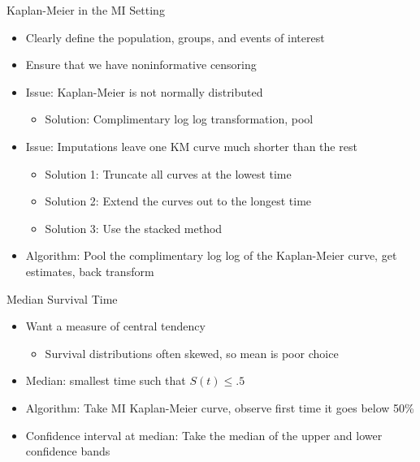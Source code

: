\begin{frame}{Kaplan-Meier in the MI Setting}
 \begin{itemize}
  \item Clearly define the population, groups, and events of interest
  \item Ensure that we have noninformative censoring
  \item Issue: Kaplan-Meier is not normally distributed
  \begin{itemize}
   \item Solution: Complimentary log log transformation, pool \cite{Marshall2009}
  \end{itemize}
  \item Issue: Imputations leave one KM curve much shorter than the rest
  \begin{itemize}
   \item Solution 1: Truncate all curves at the lowest time
   \item Solution 2: Extend the curves out to the longest time
   \item Solution 3: Use the stacked method
  \end{itemize}
\item Algorithm: Pool the complimentary log log of the Kaplan-Meier curve, get estimates,
back transform
 \end{itemize}

\end{frame}

\begin{frame}{Median Survival Time}
 \begin{itemize}
  \item Want a measure of central tendency
  \begin{itemize}
   \item Survival distributions often skewed, so mean is poor choice
  \end{itemize}
  \item Median: smallest time such that $S(t)\leq .5$
\item Algorithm: Take MI Kaplan-Meier curve, observe first time it goes below 50\%
\item Confidence interval at median: Take the median of the upper and lower confidence bands
 \end{itemize}

\end{frame}

